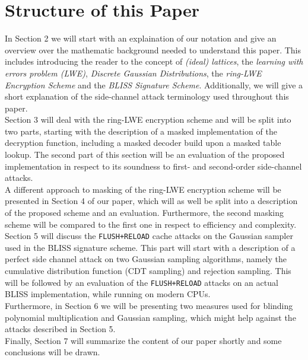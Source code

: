\section{Structure of this Paper}
In Section 2 we will start with an explaination of our notation and give an overview over the mathematic background needed to understand this paper. This includes introducing the reader to the concept of \textit{(ideal) lattices}, the \textit{learning with errors problem (LWE)}, \textit{Discrete Gaussian Distributions}, the \textit{ring-LWE Encryption Scheme} and the \textit{BLISS Signature Scheme}. Additionally, we will give a short explanation of the side-channel attack terminology used throughout this paper.\\ 
Section 3 will deal with the ring-LWE encryption scheme and will be split into two parts, starting with the description of a masked implementation of the decryption function, including a masked decoder build upon a masked table lookup. The second part of this section will be an evaluation of the proposed implementation in respect to its soundness to first- and second-order side-channel attacks.\\ 
A different approach to masking of the ring-LWE encryption scheme will be presented in Section 4 of our paper, which will as well be split into a description of the proposed scheme and an evaluation. Furthermore, the second masking scheme will be compared to the first one in respect to efficiency and complexity.\\
Section 5 will discuss the \verb|FLUSH+RELOAD| cache attacks on the Gaussian sampler used in the BLISS signature scheme. This part will start with a description of a perfect side channel attack on two Gaussian sampling algorithms, namely the cumulative distribution function (CDT sampling) and rejection sampling. This will be followed by an evaluation of the \verb|FLUSH+RELOAD| attacks on an actual BLISS implementation, while running on modern CPUs.\\
Furthermore, in Section 6 we will be presenting two measures used for blinding polynomial multiplication and Gaussian sampling, which might help against the attacks described in Section 5.\\
Finally, Section 7 will summarize the content of our paper shortly and some conclusions will be drawn.